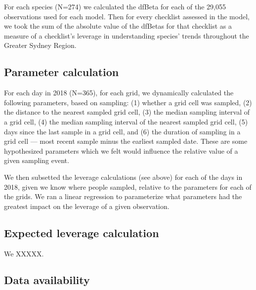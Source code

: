 \documentclass[9pt,twocolumn,twoside,lineno]{pnas-new}
\begin{document}
{For each species (N=274) we calculated the dfBeta for each of the 29,055 observations used for each model. Then for every checklist assessed in the model, we took the sum of the absolute value of the dfBetas for that checklist as a measure of a checklist's leverage in understanding species' trends throughout the Greater Sydney Region.

\subsection*{Parameter calculation} For each day in 2018 (N=365), for each grid, we dynamically calculated the following parameters, based on sampling: (1) whether a grid cell was sampled, (2) the distance to the nearest sampled grid cell, (3) the median sampling interval of a grid cell, (4) the median sampling interval of the nearest sampled grid cell, (5) days since the last sample in a grid cell, and (6) the duration of sampling in a grid cell --- most recent sample minus the earliest sampled date. These are some hypothesized parameters which we felt would influence the relative value of a given sampling event.

We then subsetted the leverage calculations (see above) for each of the days in 2018, given we know where people sampled, relative to the parameters for each of the grids. We ran a linear regression to parameterize what parameters had the greatest impact on the leverage of a given observation.

\subsection*{Expected leverage calculation} We XXXXX.

\subsection*{Data availability}


}

\showmatmethods{} %


\showacknow{} %


\end{document}
